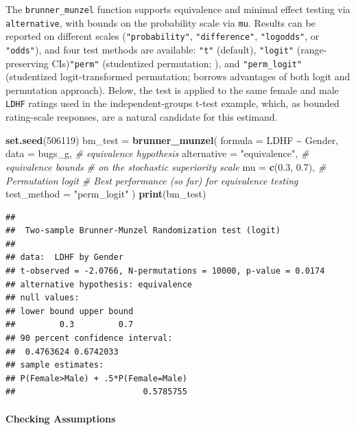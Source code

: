\documentclass[]{interact}
\theoremstyle{plain}%
\theoremstyle{definition}
\theoremstyle{remark}
\newenvironment{Shaded}{\begin{snugshade}}{\end{snugshade}}
\newcommand{\AttributeTok}[1]{\textcolor[rgb]{0.13,0.29,0.53}{#1}}
\newcommand{\CommentTok}[1]{\textcolor[rgb]{0.56,0.35,0.01}{\textit{#1}}}
\newcommand{\DecValTok}[1]{\textcolor[rgb]{0.00,0.00,0.81}{#1}}
\newcommand{\FloatTok}[1]{\textcolor[rgb]{0.00,0.00,0.81}{#1}}
\newcommand{\FunctionTok}[1]{\textcolor[rgb]{0.13,0.29,0.53}{\textbf{#1}}}
\newcommand{\NormalTok}[1]{#1}
\newcommand{\OtherTok}[1]{\textcolor[rgb]{0.56,0.35,0.01}{#1}}
\newcommand{\SpecialCharTok}[1]{\textcolor[rgb]{0.81,0.36,0.00}{\textbf{#1}}}
\newcommand{\StringTok}[1]{\textcolor[rgb]{0.31,0.60,0.02}{#1}}
\begin{document}
The \texttt{brunner\_munzel} function supports equivalence and minimal
effect testing via \texttt{alternative}, with bounds on the probability
scale via \texttt{mu}. Results can be reported on different scales
(\texttt{"probability"}, \texttt{"difference"}, \texttt{"logodds"}, or
\texttt{"odds"}), and four test methods are available: \texttt{"t"}
(default), \texttt{"logit"} (range-preserving CIs)\texttt{"perm"}
(studentized permutation; \citet{neubert2007}), and
\texttt{"perm\_logit"} (studentized logit-transformed permutation;
borrows advantages of both logit and permutation approach). Below, the
test is applied to the same female and male \texttt{LDHF} ratings used
in the independent-groups t-test example, which, as bounded rating-scale
responses, are a natural candidate for this estimand.

\begin{Shaded}
\begin{Highlighting}[]
\FunctionTok{set.seed}\NormalTok{(}\DecValTok{506119}\NormalTok{)}
\NormalTok{bm\_test }\OtherTok{=} \FunctionTok{brunner\_munzel}\NormalTok{(}
  \AttributeTok{formula =}\NormalTok{ LDHF }\SpecialCharTok{\textasciitilde{}}\NormalTok{ Gender,}
  \AttributeTok{data =}\NormalTok{ bugs\_g,}
  \CommentTok{\# equivalence hypothesis}
  \AttributeTok{alternative =} \StringTok{"equivalence"}\NormalTok{,}
  \CommentTok{\# equivalence bounds }
  \CommentTok{\# on the stochastic superiority scale}
  \AttributeTok{mu =} \FunctionTok{c}\NormalTok{(}\FloatTok{0.3}\NormalTok{, }\FloatTok{0.7}\NormalTok{),}
  \CommentTok{\# Permutation logit}
  \CommentTok{\# Best performance (so far) for equivalence testing}
  \AttributeTok{test\_method =} \StringTok{"perm\_logit"}
\NormalTok{)}
\FunctionTok{print}\NormalTok{(bm\_test)}
\end{Highlighting}
\end{Shaded}

\begin{verbatim}
## 
##  Two-sample Brunner-Munzel Randomization test (logit)
## 
## data:  LDHF by Gender
## t-observed = -2.0766, N-permutations = 10000, p-value = 0.0174
## alternative hypothesis: equivalence
## null values:
## lower bound upper bound 
##         0.3         0.7 
## 90 percent confidence interval:
##  0.4763624 0.6742033
## sample estimates:
## P(Female>Male) + .5*P(Female=Male) 
##                          0.5785755
\end{verbatim}

\paragraph{Checking Assumptions}\label{checking-assumptions-4}
\end{document}
